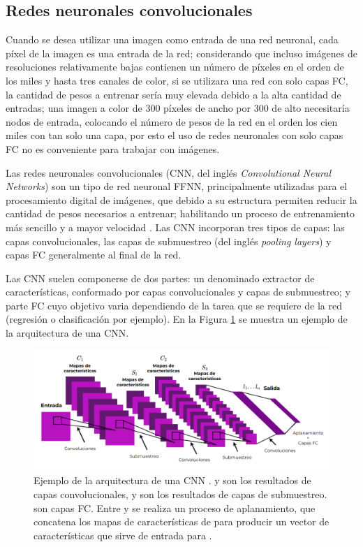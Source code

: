 \subsection{Redes neuronales convolucionales}

Cuando se desea utilizar una imagen como entrada de una red neuronal, cada píxel de la imagen es una entrada de la red; considerando que incluso imágenes de resoluciones relativamente bajas contienen un número de píxeles en el orden de los miles y hasta tres canales de color, si se utilizara una red con solo capas FC, la cantidad de pesos a entrenar sería muy elevada debido a la alta cantidad de entradas; una imagen a color de 300 píxeles de ancho por 300 de alto necesitaría  nodos de entrada, colocando el número de pesos de la red en el orden los cien miles con tan solo una capa, por esto el uso de redes neuronales con solo capas FC no es conveniente para trabajar con imágenes.

Las redes neuronales convolucionales (CNN, del inglés \textit{Convolutional Neural Networks}) son un tipo de red neuronal FFNN, principalmente utilizadas para el procesamiento digital de imágenes, que debido a su estructura permiten reducir la cantidad de pesos necesarios a entrenar; habilitando un proceso de entrenamiento más sencillo y a mayor velocidad \cite{Lecun2010}. Las CNN incorporan tres tipos de capas: las capas convolucionales, las capas de submuestreo (del inglés \textit{pooling layers}) y capas FC generalmente al final de la red.

Las CNN suelen componerse de dos partes: un denominado extractor de características, conformado por capas convolucionales y capas de submuestreo; y parte FC cuyo objetivo varia dependiendo de la tarea que se requiere de la red (regresión o clasificación por ejemplo). En la Figura \ref{fig:cnn-sample} se muestra un ejemplo de la arquitectura de una CNN.

\begin{figure}[H]
    \centering
    \includegraphics[scale=0.35]{partes/img/CNN-sample.png}
    \caption[Ejemplo de la arquitectura de una CNN.]{
        Ejemplo de la arquitectura de una CNN \cite{Lecun2010}.  y  son los resultados de capas convolucionales,  y  son los resultados de capas de submuestreo.  son  capas FC. Entre  y  se realiza un proceso de aplanamiento, que concatena los mapas de características de  para producir un vector de características que sirve de entrada para .
    } 
    \label{fig:cnn-sample}
\end{figure}

